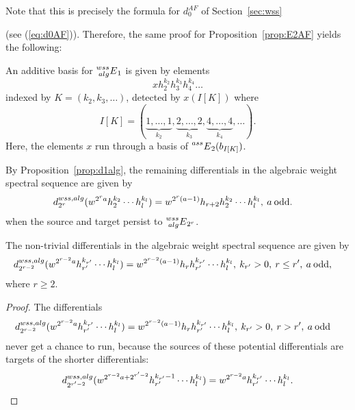 Note that this is precisely the formula for $d_0^{AF}$ of Section~\ref{sec:wss} {(see (\ref{eq:d0AF})).  Therefore, the same proof for Proposition~\ref{prop:E2AF} yields the following:

\begin{prop}\label{prop:E1wssalg}
	An additive basis for $\prescript{wss}{alg}{E}_1$ is given by elements
	$$ x h_2^{k_2} h_3^{k_3}h_4^{k_4} \ldots $$
	indexed by $K = (k_2, k_3, \ldots)$, detected by $x(I[K])$ where 
	$$ I[K] = (\underbrace{1, \ldots ,1}_{k_2}, \underbrace{2, \ldots ,2}_{k_3}, \underbrace{4, \ldots ,4}_{k_4}, \ldots). $$
	Here, the elements $x$ run through a basis of $\prescript{ass}{}{E}_2(b_{I[K]})$.
\end{prop}

By Proposition~\ref{prop:d1alg}, the remaining differentials in the algebraic weight spectral sequence are given by
\begin{align*}
d_{2^r}^{wss, alg}(w^{2^r a}h_2^{k_2} \cdots h_l^{k_l}) & = w^{2^r(a-1)} h_{r+2} h_2^{k_2} \cdots h_l^{k_l}, \: a \: \mathrm{odd}. 
\end{align*}
when the source and target persist to $\prescript{wss}{alg}{E}_{2^r}$.

\begin{lem}\label{lem:drwssalg}
The non-trivial differentials in the algebraic weight spectral sequence are given by
\begin{align*}
d_{2^{r-2}}^{wss, alg}(w^{2^{r-2} a}h_{r'}^{k_{r'}}  \cdots h_l^{k_l}) & = w^{2^{r-2}(a-1)} h_r h_{r'}^{k_{r'}}  \cdots h_l^{k_l}, \: k_{r'} > 0, \: r \le r', \: a \: \mathrm{odd},
\end{align*}
where $r\geq 2$.
\end{lem}


\begin{proof}
The differentials
\begin{align*}
d_{2^{r-2}}^{wss, alg}(w^{2^{r-2} a}h_{r'}^{k_{r'}}  \cdots h_l^{k_l}) & = w^{2^{r-2}(a-1)} h_r h_{r'}^{k_{r'}}  \cdots h_l^{k_l}, \: k_{r'} > 0, \: r > r', \: a \: 
\mathrm{odd}
\end{align*}
never get a chance to run, because the sources of these potential differentials are targets of the shorter differentials:
\[d_{2^{r'-2}}^{wss, alg}(w^{2^{r-2} a+2^{r'-2}}h_{r'}^{k_{r'}-1}  \cdots h_l^{k_l})  = w^{2^{r-2} a}h_{r'}^{k_{r'}}  \cdots h_l^{k_l}. \qedhere\]
\end{proof}


}
